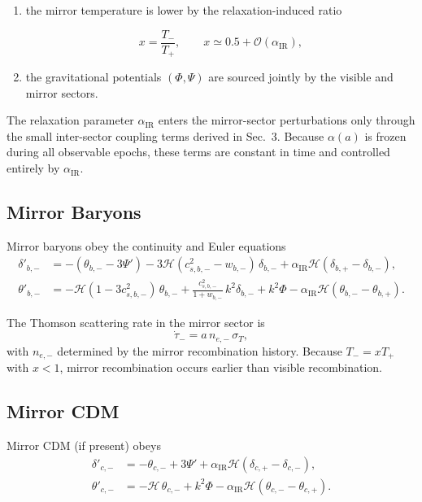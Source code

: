 \documentclass[11pt,a4paper]{article}
\begin{document}
\begin{enumerate}
    \item the mirror temperature is lower by the relaxation-induced ratio
    

\[
        x = \frac{T_{-}}{T_{+}}, \qquad x \simeq 0.5 + \mathcal{O}(\alpha_{\mathrm{IR}}),
    \]


    \item the gravitational potentials $(\Phi,\Psi)$ are sourced jointly by the visible and mirror
    sectors.
\end{enumerate}

The relaxation parameter $\alpha_{\mathrm{IR}}$ enters the mirror-sector perturbations only through
the small inter-sector coupling terms derived in Sec.~3. Because $\alpha(a)$ is frozen during all
observable epochs, these terms are constant in time and controlled entirely by $\alpha_{\mathrm{IR}}$.

\subsection{Mirror Baryons}

Mirror baryons obey the continuity and Euler equations
\begin{align}
    \delta'_{b,-}
    &= -(\theta_{b,-} - 3\Psi')
       - 3\mathcal{H}(c_{s,b,-}^{2} - w_{b,-})\,\delta_{b,-}
       + \alpha_{\mathrm{IR}}\mathcal{H}(\delta_{b,+} - \delta_{b,-}), \\
    \theta'_{b,-}
    &= -\mathcal{H}(1 - 3c_{s,b,-}^{2})\,\theta_{b,-}
       + \frac{c_{s,b,-}^{2}}{1+w_{b,-}}\,k^{2}\delta_{b,-}
       + k^{2}\Phi
       - \alpha_{\mathrm{IR}}\mathcal{H}(\theta_{b,-} - \theta_{b,+}).
\end{align}

The Thomson scattering rate in the mirror sector is
\begin{equation}
    \dot{\tau}_{-} = a\,n_{e,-}\,\sigma_{T},
\end{equation}
with $n_{e,-}$ determined by the mirror recombination history. Because $T_{-} = xT_{+}$ with
$x < 1$, mirror recombination occurs earlier than visible recombination.

\subsection{Mirror CDM}

Mirror CDM (if present) obeys
\begin{align}
    \delta'_{c,-}
    &= -\theta_{c,-} + 3\Psi'
       + \alpha_{\mathrm{IR}}\mathcal{H}(\delta_{c,+} - \delta_{c,-}), \\
    \theta'_{c,-}
    &= -\mathcal{H}\,\theta_{c,-}
       + k^{2}\Phi
       - \alpha_{\mathrm{IR}}\mathcal{H}(\theta_{c,-} - \theta_{c,+}).
\end{align}
\end{document}
